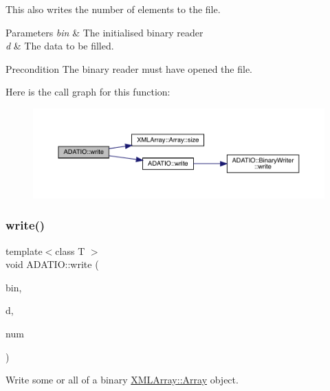 This also writes the number of elements to the file. 
\begin{DoxyParams}{Parameters}
{\em bin} & The initialised binary reader \\
\hline
{\em d} & The data to be filled.\\
\hline
\end{DoxyParams}
\begin{DoxyPrecond}{Precondition}
The binary reader must have opened the file. 
\end{DoxyPrecond}
Here is the call graph for this function\+:
\nopagebreak
\begin{figure}[H]
\begin{center}
\leavevmode
\includegraphics[width=350pt]{d0/dba/namespaceADATIO_a70c8ce102a5eca8961bb57bf7b8b6bd1_cgraph}
\end{center}
\end{figure}
\mbox{\label{namespaceADATIO_a7a09030036bf1cc4704ecdcdf4cd6090}} 
\subsubsection{\texorpdfstring{write()}{write()}\hspace{0.1cm}{\footnotesize\ttfamily [16/25]}}
{\footnotesize\ttfamily template$<$class T $>$ \\
void A\+D\+A\+T\+I\+O\+::write (\begin{DoxyParamCaption}\item[{\mbox{\hyperlink{classADATIO_1_1BinaryWriter}{Binary\+Writer}} \&}]{bin,  }\item[{const \mbox{\hyperlink{classXMLArray_1_1Array}{X\+M\+L\+Array\+::\+Array}}$<$ T $>$ \&}]{d,  }\item[{int}]{num }\end{DoxyParamCaption})\hspace{0.3cm}{\ttfamily [inline]}}



Write some or all of a binary \mbox{\hyperlink{classXMLArray_1_1Array}{X\+M\+L\+Array\+::\+Array}} object. 

